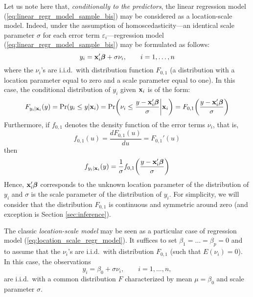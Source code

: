 Let us note here that, \emph{conditionally to the predictors}, the linear
regression model (\ref{eq:linear_regr_model_sample_bis}) may be considered as a
location-scale model. Indeed, under the assumption of homoscedasticity---an
identical scale parameter $\sigma$ for each error term
$\varepsilon_{i}$---regression model (\ref{eq:linear_regr_model_sample_bis})
may be formulated as follows:
%
\begin{equation}
    \label{eq:location_scale_regr_model}
    y_{i} = \mathbf x_{i}'\boldsymbol\beta + \sigma\nu_{i}, 
    \qquad i = 1, \dots, n
\end{equation}
%
where the $\nu_{i}$'s are i.i.d.\ with distribution function $F_{0,1}$ (a
distribution with a location parameter equal to zero and a scale parameter
equal to one). In this case, the conditional distribution of $y_{i}$ given
$\mathbf x_{i}$ is of the form:
%
\begin{equation}
    \label{eq:distr_function_yi}
    F_{y_{i} | \stvec{x}_{i}}(y) 
    = \Pr(y_{i} \leq y | \stvec{x}_{i}) 
    = \Pr\left(\nu_{i} \leq \frac{y - \stvec{x}_{i}'\boldsymbol\beta}{\sigma} \bigg| \stvec{x}_{i}\right)
    = F_{0,1}\left(\frac{y - \stvec{x}_{i}'\boldsymbol\beta}{\sigma}\right)
\end{equation}
%
Furthermore, if $f_{0,1}$ denotes the density function of the error terms 
$\nu_{i}$, that is,
\[
    f_{0,1}(u) = \frac{d F_{0,1}(u)}{d u} = F_{0,1}'(u)
\]
then
%
\begin{equation}
    \label{eq:dens_function_yi}
    f_{y_{i} | \stvec{x}_{i}}(y) 
    = \frac{1}{\sigma} f_{0,1}\left(\frac{y - \stvec{x}_{i}'\boldsymbol\beta}{\sigma}\right)
\end{equation}
%
Hence, $\mathbf x_{i}'\boldsymbol\beta$ corresponds to the unknown location
parameter of the distribution of $y_{i}$ and $\sigma$ is the scale parameter of
the distribution of $y_{i}$. For simplicity, we will consider that the
distribution $F_{0,1}$ is continuous and symmetric around zero (and exception
is Section \ref{sec:inference}).

\begin{stremark}
The classic \emph{location-scale model} may be seen as a particular case of
regression model (\ref{eq:location_scale_regr_model}). It suffices to set
$\beta_{1} = \dots = \beta_{p} = 0$ and to assume that the $\nu_{i}$'s are
i.i.d.\ with distribution $F_{0,1}$ (such that $E(\nu_{i})=0$). In this case,
the observations
%
\begin{equation}
    \label{eq:location_scale_model}
    y_{i} = \beta_{0} + \sigma\nu_{i},
    \qquad i=1, \dots, n,
\end{equation}
%
are i.i.d.\ with a common distribution $F$ characterized by mean $\mu =
\beta_{0}$ and scale parameter $\sigma$.
\end{stremark}

